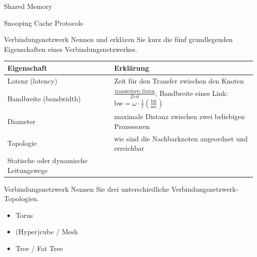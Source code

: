 \begin{defi}{Shared Memory}
\begin{defi}{Snooping Cache Protocols}
        \begin{aufgabe}{Verbindungsnetzwerk}
            Nennen und erklären Sie kurz die fünf grundlegenden Eigenschaften eines Verbindungsnetzwerkes.
            \tcblower
            \begin{tabularx}{\textwidth}{|X|X|}
                \toprule
                Eigenschaft            & Erklärung                                                                                                                                                    \\
                \midrule
                Latenz (latency)       & Zeit für den Transfer zwischen den Knoten                                                                                                                    \\
                \midrule
                Bandbreite (bandwidth) & $\frac{\text{transferierte Daten}}{Zeit}$, \newline Bandbreite eines Link: $\text{bw} = \omega \cdot \frac{1}{t} \left(\frac{\text{bit}}{\text{sec}}\right)$ \\
                \midrule
                Diameter               & maximale Distanz zwischen zwei beliebigen Prozessoren                                                                                                        \\
                \midrule
                Topologie              & wie sind die Nachbarknoten angeordnet und erreichbar                                                                                                         \\
                \midrule
                Statische oder \newline dynamische Leitungswege \\
                \bottomrule
            \end{tabularx}
        \end{aufgabe}

        \begin{aufgabe}{Verbindungsnetzwerk}
            Nennen Sie drei unterschiedliche Verbindungsnetzwerk-Topologien.
            \tcblower
            \begin{itemize}
                \item Torus
                \item (Hyper)cube / Mesh
                \item Tree / Fat Tree
            \end{itemize}
        \end{aufgabe}


\end{defi}
\end{defi}
